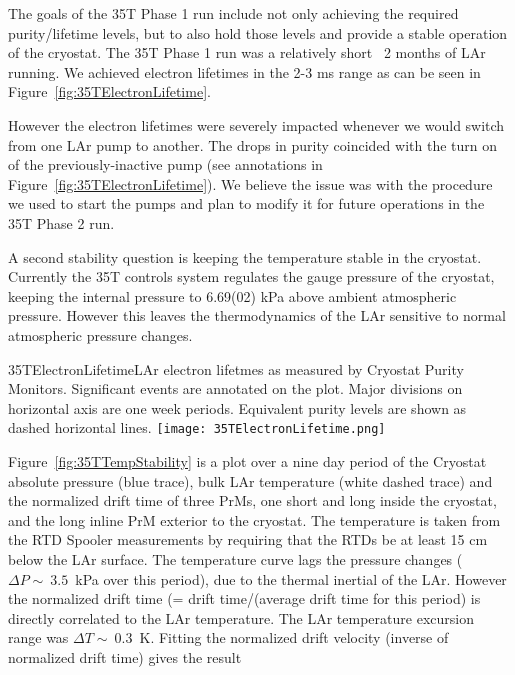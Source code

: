 The goals of the 35T Phase 1 run include not only achieving the required purity/lifetime levels, but to 
also hold those levels and provide a stable operation of the cryostat. The 35T Phase 1 run was a relatively 
short  ~2 months of LAr running. We achieved electron lifetimes in the 2-3 ms range as can be seen in 
Figure~\ref{fig:35TElectronLifetime}.

However the electron lifetimes were severely impacted whenever we would switch from one LAr pump to 
another. The drops in purity coincided with the turn on of the previously-inactive pump (see annotations 
in Figure~\ref{fig:35TElectronLifetime}). We believe the issue was with the procedure we used to start the 
pumps and plan to modify it for future operations in the 35T Phase 2 run.

A second stability question is keeping the temperature stable in the cryostat. Currently the 35T controls 
system regulates the gauge pressure of the cryostat, keeping the internal pressure to 6.69(02) kPa above 
ambient atmospheric pressure. However this leaves the thermodynamics of the LAr sensitive to normal 
atmospheric pressure changes.

\begin{cdrfigure}{35TElectronLifetime}{LAr electron lifetmes as measured by 
Cryostat Purity Monitors. Significant events are annotated on the plot. Major divisions on horizontal axis 
are one week periods. Equivalent purity levels are shown as dashed horizontal lines.}
  \texttt{[image: 35TElectronLifetime.png]}
\end{cdrfigure}

Figure~\ref{fig:35TTempStability} is a plot over a nine day period of the Cryostat absolute pressure (blue 
trace), bulk LAr temperature (white dashed trace) and the normalized drift time of three PrMs, one short 
and long inside the cryostat, and the long inline PrM exterior to the cryostat. The temperature is taken 
from the RTD Spooler measurements by requiring that the RTDs be at least 15 cm below the LAr surface. 
The temperature curve lags the pressure changes ($\Delta P \sim~3.5$~kPa over this period), due to the thermal 
inertial of the LAr. However the normalized drift time (= drift time/(average drift time for this period) is 
directly correlated to the LAr temperature. The LAr temperature excursion range was $\Delta T \sim~0.3$~K. 
Fitting the normalized drift velocity (inverse of normalized drift time) gives the result 


